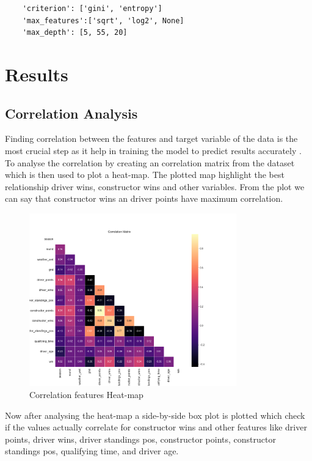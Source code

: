 \documentclass[11pt,article,oneside]{article}
\begin{document}
\begin{verbatim}
    'criterion': ['gini', 'entropy']
    'max_features':['sqrt', 'log2', None]
    'max_depth': [5, 55, 20] 
\end{verbatim}

\section{Results}
\subsection{Correlation Analysis}
Finding correlation between the features and target variable of the data is the most crucial step as it help in training the model to predict results accurately \citep{ref8}. To analyse the correlation by creating an correlation matrix from the dataset which is then used to plot a heat-map. The plotted map highlight the best relationship driver wins, constructor wins and other variables. 
From the plot we can say that constructor wins an driver points have maximum correlation.

\begin{figure}[htbp]
    \centering
    \includegraphics[width=0.8\textwidth]{code/Images/correlation_heat-map.png}
    \caption{Correlation features Heat-map}
\end{figure}

Now after analysing the heat-map a side-by-side box plot is plotted which check if the values actually correlate for constructor wins and other features like driver points, driver wins, driver standings pos, constructor points, constructor standings pos, qualifying time, and driver age.
\end{document}
